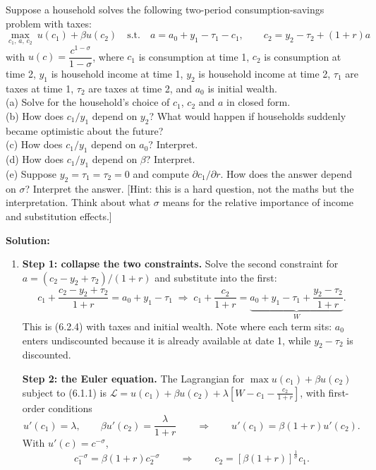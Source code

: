 \documentclass[12pt, letterpaper]{article}
\begin{document}
\begin{tcolorbox}[oddbox,title={Problem 6.1 \quad Two-Period Problem with Taxes and Initial Wealth}]
\begin{tcolorbox}[questionbox]
Suppose a household solves the following two-period consumption-savings problem with taxes:
\[
\max_{c_1,\,a,\,c_2}\ u(c_1)+\beta u(c_2)
\quad\text{s.t.}\quad
a=a_0+y_1-\tau_1-c_1,
\qquad
c_2=y_2-\tau_2+(1+r)a
\]
with $u(c)=\dfrac{c^{1-\sigma}}{1-\sigma}$, where $c_1$ is consumption at time 1, $c_2$ is
consumption at time 2, $y_1$ is household income at time 1, $y_2$ is household income at
time 2, $\tau_1$ are taxes at time 1, $\tau_2$ are taxes at time 2, and $a_0$ is initial
wealth.\\[3pt]
(a) Solve for the household's choice of $c_1$, $c_2$ and $a$ in closed form.\\[3pt]
(b) How does $c_1/y_1$ depend on $y_2$? What would happen if households suddenly became
optimistic about the future?\\[3pt]
(c) How does $c_1/y_1$ depend on $a_0$? Interpret.\\[3pt]
(d) How does $c_1/y_1$ depend on $\beta$? Interpret.\\[3pt]
(e) Suppose $y_2=\tau_1=\tau_2=0$ and compute $\partial c_1/\partial r$. How does the answer
depend on $\sigma$? Interpret the answer. [Hint: this is a hard question, not the maths but
the interpretation. Think about what $\sigma$ means for the relative importance of income
and substitution effects.]
\end{tcolorbox}

\textbf{Solution:}
\begin{enumerate}

\item \textbf{Step 1: collapse the two constraints.} Solve the second constraint for
$a=(c_2-y_2+\tau_2)/(1+r)$ and substitute into the first:
\[
c_1+\frac{c_2-y_2+\tau_2}{1+r}=a_0+y_1-\tau_1
\;\Longrightarrow\;
c_1+\frac{c_2}{1+r}=\underbrace{a_0+y_1-\tau_1+\frac{y_2-\tau_2}{1+r}}_{\textstyle W} .
\tag{6.1.1}
\]
This is (6.2.4) with taxes and initial wealth. Note where each term sits: $a_0$ enters
undiscounted because it is already available at date 1, while $y_2-\tau_2$ is discounted.

\smallskip
\textbf{Step 2: the Euler equation.} The Lagrangian for
$\max u(c_1)+\beta u(c_2)$ subject to (6.1.1) is
$\mathcal{L}=u(c_1)+\beta u(c_2)+\lambda\left[W-c_1-\frac{c_2}{1+r}\right]$, with
first-order conditions
\[
u'(c_1)=\lambda,
\qquad
\beta u'(c_2)=\frac{\lambda}{1+r}
\qquad\Longrightarrow\qquad
u'(c_1)=\beta(1+r)u'(c_2) .
\]
With $u'(c)=c^{-\sigma}$,
\[
c_1^{-\sigma}=\beta(1+r)c_2^{-\sigma}
\qquad\Longrightarrow\qquad
c_2=\left[\beta(1+r)\right]^{\frac{1}{\sigma}}c_1 .
\tag{6.1.2}
\]


\end{enumerate}
\end{tcolorbox}
\end{document}

